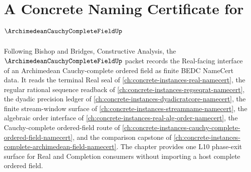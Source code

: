 \chapter{A Concrete Naming Certificate for $\ArchimedeanCauchyCompleteFieldUp$}
\label{ch:concrete-instances-archimedean-cauchy-complete-field-namecert}

Following Bishop and Bridges, Constructive Analysis, the $\ArchimedeanCauchyCompleteFieldUp$ packet records the Real-facing interface of an Archimedean Cauchy-complete ordered field as finite BEDC NameCert data. It reads the terminal Real seal of \autoref{ch:concrete-instances-real-namecert}, the regular rational sequence readback of \autoref{ch:concrete-instances-regseqrat-namecert}, the dyadic precision ledger of \autoref{ch:concrete-instances-dyadicratcore-namecert}, the finite stream-window surface of \autoref{ch:concrete-instances-streamname-namecert}, the algebraic order interface of \autoref{ch:concrete-instances-real-alg-order-namecert}, the Cauchy-complete ordered-field route of \autoref{ch:concrete-instances-cauchy-complete-ordered-field-namecert}, and the comparison capstone of \autoref{ch:concrete-instances-complete-archimedean-field-namecert}. The chapter provides one L10 phase-exit surface for Real and Completion consumers without importing a host complete ordered field.

